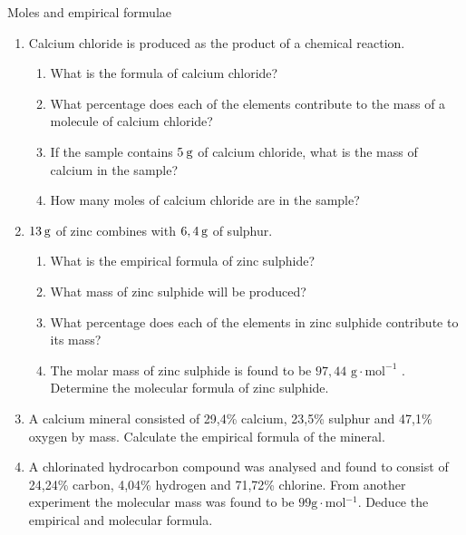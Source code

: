             \begin{exercises}{Moles and empirical formulae
      }
            \nopagebreak \noindent
      \label{m38712*id281924}\begin{enumerate}[noitemsep, label=\textbf{\arabic*}. ] 
            \label{m38712*uid73}\item Calcium chloride is produced as the product of a chemical reaction.
\label{m38712*id281940}\begin{enumerate}[noitemsep, label=\textbf{\alph*}. ] 
            \label{m38712*uid74}\item What is the formula of calcium chloride?
\label{m38712*uid75}\item What percentage does each of the elements contribute to the mass of a molecule of calcium chloride?
\label{m38712*uid76}\item If the sample contains $5\phantom{\rule{2pt}{0ex}}\text{g}$ of calcium chloride, what is the mass of calcium in the sample?
\label{m38712*uid77}\item How many moles of calcium chloride are in the sample?
\end{enumerate}
                \label{m38712*uid78}\item $13\phantom{\rule{2pt}{0ex}}\text{g}$ of zinc combines with $6,4\phantom{\rule{2pt}{0ex}}\text{g}$ of sulphur.
\label{m38712*id282007}\begin{enumerate}[noitemsep, label=\textbf{\alph*}. ] 
\item  What is the empirical formula of zinc sulphide?
            \label{m38712*uid79}\item What mass of zinc sulphide will be produced?
\label{m38712*uid80}\item What percentage does each of the elements in zinc sulphide contribute to its mass?
\label{m38712*uid81}\item The molar mass of zinc sulphide is found to be $97,44 \text{ g} \cdot \text{mol}^{−1}$ . Determine the molecular formula of zinc sulphide.
\end{enumerate}
                \label{m38712*uid82}\item A calcium mineral consisted of 29,4\% calcium, 23,5\% sulphur and 47,1\% oxygen by mass. Calculate the empirical formula of the mineral.\newline
\label{m38712*uid83}\item A chlorinated hydrocarbon compound was analysed and found to consist of 24,24\% carbon, 4,04\% hydrogen and 71,72\% chlorine. From another experiment the molecular mass was found to be $99\text{g}\ensuremath{\cdot}\text{mol}{}^{-1}$. Deduce the empirical and molecular formula.\newline

\end{enumerate}
\end{exercises}
